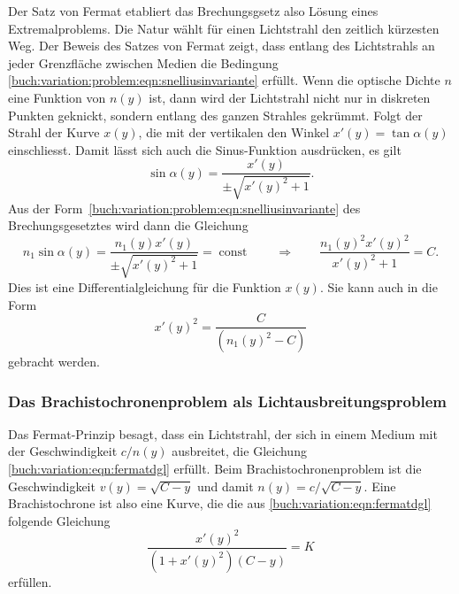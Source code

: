 Der Satz von Fermat etabliert das Brechungsgsetz also Lösung eines
Extremalproblems.
Die Natur wählt für einen Lichtstrahl den zeitlich kürzesten Weg.
Der Beweis des Satzes von Fermat zeigt, dass entlang des Lichtstrahls
an jeder Grenzfläche zwischen Medien die Bedingung
\eqref{buch:variation:problem:eqn:snelliusinvariante}
erfüllt.
Wenn die optische Dichte $n$ eine Funktion von $n(y)$ ist, dann
wird der Lichtstrahl nicht nur in diskreten Punkten geknickt, sondern
entlang des ganzen Strahles gekrümmt.
Folgt der Strahl der Kurve $x(y)$, die mit der vertikalen den Winkel
$x'(y) = \tan\alpha(y)$ einschliesst.
Damit lässt sich auch die Sinus-Funktion ausdrücken, es gilt
\[
\sin\alpha(y)
=
\frac{x'(y)}{\pm\!\sqrt{x'(y)^2+1}}.
\]
Aus der Form~\eqref{buch:variation:problem:eqn:snelliusinvariante}
des Brechungsgesetztes wird dann die Gleichung
\begin{equation}
n_1\sin\alpha(y)
=
\frac{n_1(y)x'(y)}{\pm\!\sqrt{x'(y)^2+1}}
=
\operatorname{const}
\qquad\Rightarrow\qquad
\frac{n_1(y)^2x'(y)^2}{x'(y)^2+1}=C.
\label{buch:variation:eqn:fermatdgl}
\end{equation}
Dies ist eine Differentialgleichung für die Funktion $x(y)$.
Sie kann auch in die Form
\[
x'(y)^2
=
\frac{C}{(n_1(y)^2-C)}
\]
gebracht werden.

%
%
\subsubsection{Das Brachistochronenproblem als Lichtausbreitungsproblem}
Das Fermat-Prinzip besagt, dass ein Lichtstrahl, der sich in einem Medium
mit der Geschwindigkeit $c/n(y)$ ausbreitet, die Gleichung 
\eqref{buch:variation:eqn:fermatdgl} erfüllt.
Beim Brachistochronenproblem ist die Geschwindigkeit $v(y)=\!\sqrt{C-y}$ und 
damit $n(y) = c/\!\sqrt{C-y}$.
Eine Brachistochrone ist also eine Kurve, die die aus
\eqref{buch:variation:eqn:fermatdgl} folgende Gleichung
\begin{equation}
\frac{x'(y)^2}{(1+x'(y)^2)(C-y)} = K
\label{buch:variation:problem:eqn:bernoullidgl}
\end{equation}
erfüllen.

%
%
